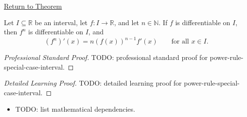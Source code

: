 \newpage
{}
\label{prf:power-rule-special-case-interval}

\begin{remark*}[Return]
\hyperref[cor:power-rule-special-case-interval]{Return to Theorem}
\end{remark*}

\begin{theorem*}
Let $I \subseteq \mathbb{R}$ be an interval, let $f : I \to \mathbb{R}$, and let $n \in \mathbb{N}$. If $f$ is differentiable on $I$, then $f^n$ is differentiable on $I$, and
\[
(f^n)'(x) = n(f(x))^{n-1}f'(x) \qquad \text{for all } x \in I.
\]
\end{theorem*}

\begin{proof}[Professional Standard Proof]
\LRAProofBodyStart
TODO: professional standard proof for power-rule-special-case-interval.
\end{proof}

\begin{proof}[Detailed Learning Proof]
\LRAProofBodyStart
TODO: detailed learning proof for power-rule-special-case-interval.
\end{proof}

\begin{remark*}
\end{remark*}

\begin{dependencies}
\begin{itemize}
  \item TODO: list mathematical dependencies.
\end{itemize}
\end{dependencies}

\clearpage
